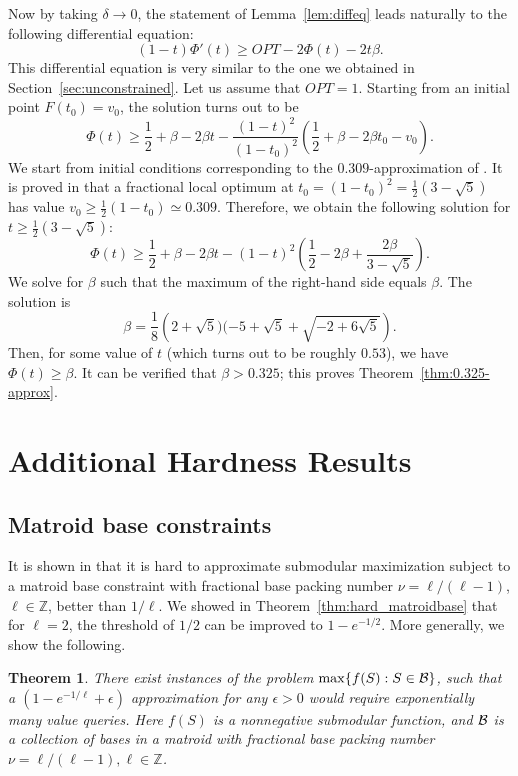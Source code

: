 \documentclass{article}[11pt]
\newtheorem{theorem}{Theorem}[section]
\def\ZZ{{\mathbb Z}}
\def\cB{{\cal B}}
\def\eps {\epsilon}
\def\max{{\rm{max}}}
\begin{document}
Now by taking $\delta \rightarrow 0$,
the statement of Lemma~\ref{lem:diffeq} leads naturally to the following differential equation:
$$ (1-t) \Phi'(t) \geq OPT - 2 \Phi(t) - 2t\beta.$$
This differential equation is very similar to the one we obtained in 
Section~\ref{sec:unconstrained}. Let us assume that $OPT=1$.
Starting from an initial point $F(t_0) = v_0$, the solution turns out to be
$$ \Phi(t) \geq \frac12 + \beta - 2 \beta t - \frac{(1-t)^2}{(1-t_0)^2}
 \left( \frac12 + \beta - 2 \beta t_0 - v_0 \right).$$
We start from initial conditions corresponding to the $0.309$-approximation
of \cite{Vondrak09}. It is proved in \cite{Vondrak09} that a fractional local optimum
at $t_0 = (1-t_0)^2 = \frac12 (3-\sqrt{5})$ has value $v_0 \geq \frac12 (1-t_0)
 \simeq 0.309$.
Therefore, we obtain the following solution for $t \geq \frac12 (3-\sqrt{5})$:
$$ \Phi(t) \geq \frac12 + \beta - 2 \beta t - (1-t)^2
 \left( \frac12 - 2 \beta + \frac{2 \beta}{3-\sqrt{5}} \right). $$
We solve for $\beta$ such that the maximum of the right-hand side equals $\beta$.
The solution is 
$$ \beta = \frac18 \left(2+\sqrt{5})(-5 + \sqrt{5} + \sqrt{-2 + 6 \sqrt{5}} \right).$$
Then, for some value of $t$ (which turns out to be roughly $0.53$),
we have $\Phi(t) \geq \beta$. It can be verified that $\beta > 0.325$;
this proves Theorem~\ref{thm:0.325-approx}.






\section{Additional Hardness Results}
\label{app:hardness}

\subsection{Matroid base constraints}

It is shown in \cite{Vondrak09} that it is hard to approximate submodular maximization
subject to a matroid base constraint with fractional base packing number $\nu = \ell/(\ell-1)$,
$\ell \in \ZZ$, better than $1/\ell$.
We showed in Theorem~\ref{thm:hard_matroidbase} that for $\ell=2$,
the threshold of $1/2$ can be improved to $1-e^{-1/2}$.
More generally, we show the following. 

\begin{theorem}
There exist instances of the problem $\max\{f(S):S\in \cB \}$,
such that a $(1-e^{-1/\ell}+\eps)$ approximation for any $\eps>0$ 
would require exponentially many value queries.
Here $f(S)$ is a nonnegative submodular function,
and $\cB$ is a collection of bases in a matroid with fractional base packing
number $\nu = \ell/(\ell-1), \ell \in \ZZ$. 
\end{theorem}
\end{document}

